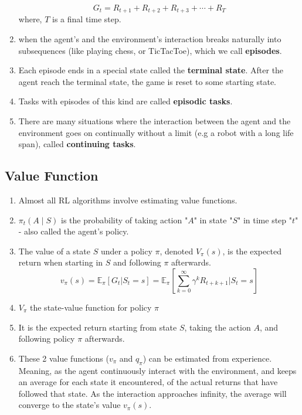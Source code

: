 \begin{enumerate}
\[        G_t = R_{t+1} +R_{t+2} +R_{t+3} + \cdots + R_T
    \]
    where, $T$ is a final time step.
    \item when the agent’s and the environment’s interaction breaks naturally into subsequences (like playing chess, or TicTacToe), which we call \textbf{episodes}.
    \item Each episode ends in a special state called the \textbf{terminal state}. After the agent reach the terminal state, the game is reset to some starting state.
    \item Tasks with episodes of this kind are called \textbf{episodic tasks}.
    \item There are many situations where the interaction between the agent and the environment goes on continually without a limit (e.g a robot with a long life span), called \textbf{continuing tasks}.
\end{enumerate}

\subsection{Value Function}
\begin{enumerate}
    \item Almost all RL algorithms involve estimating value functions.
    \item $\pi_t(A \mid S)$ is the probability of taking action "$A$" in state "$S$" in time step "$t$" - also called the agent’s policy.
    \item The value of a state $S$ under a policy $\pi$, denoted $V_\pi(s)$, is the expected return when starting in $S$ and following $\pi$ afterwards.
    \[
        v_\pi(s) = \mathbb{E}_\pi \left[G_t|S_t=s\right] = \mathbb{E}_\pi\left[\sum_{k=0}^{\infty} \gamma^k R_{t+k+1} \bigg| S_t=s\right]
    \]
    \item $V_\pi$ the state-value function for policy $\pi$
    \item It is the expected return starting from state $S$, taking the action $A$, and following policy $\pi$ afterwards.
    \item These 2 value functions ($v_\pi$ and $q_\pi$) can be estimated from experience. Meaning, as the agent continuously interact with the environment, and keeps an average for each state it encountered, of the actual returns that have followed that state. As the interaction approaches infinity, the average will converge to the state’s value $v_\pi(s)$.
\end{enumerate}

